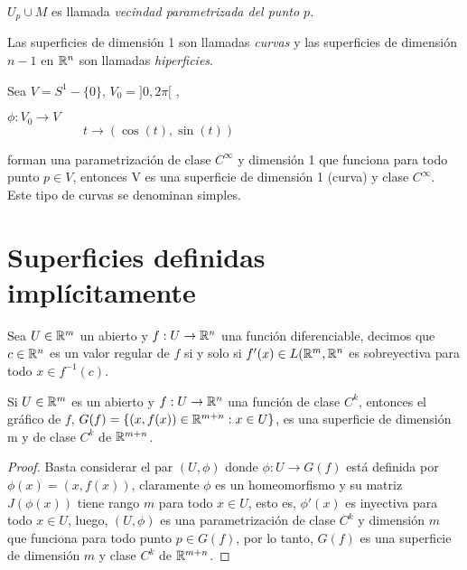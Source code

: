 \begin{Obs}
$U_{p}\cup M$ es llamada \textit{vecindad parametrizada del punto $p$}.
\end{Obs}

\begin{Obs}
Las superficies de dimensión 1 son llamadas \textit{curvas} y las superficies de dimensión $n-1$ en ${\mathbb{R}}^{n}$ son llamadas \textit{hiperficies}.
\end{Obs}

\begin{Ejm}
Sea $V=S^{1}-\{0\}$, $V_{0}=]0,2\pi[$ ,
\begin{center}
    $\phi:V_{0}\rightarrow V$\\
    $\qquad \qquad \qquad  t\longrightarrow(\cos(t),\sin(t))$
\end{center} forman una parametrización de clase $C^{\infty}$ y dimensión 1 que funciona para todo punto $p\in V$, entonces V es una superficie de dimensión 1 (curva) y clase $C^{\infty}$. Este tipo de curvas se denominan simples.
\end{Ejm}

\section{Superficies definidas implícitamente}

\begin{Def}
Sea $U\in{\mathbb{R}}^{m}$ un abierto y $f:U\rightarrow{\mathbb{R}}^{n}$ una función diferenciable, decimos que $c\in{\mathbb{R}}^{n}$ es un valor regular de $f$ si y solo si $f'(x)\in L({\mathbb{R}}^{m},{\mathbb{R}}^{n}$ es sobreyectiva para todo $x\in f^{-1}(c)$.
\end{Def}

\begin{Lem}
Si $U\in{\mathbb{R}}^{m}$ es un abierto y $f:U\rightarrow{\mathbb{R}}^{n}$ una función de clase $C^{k}$, entonces el gráfico de $f$, $G(f)=\{(x,f(x))\in {\mathbb{R}}^{m+n}:x\in U\}$, es una superficie de dimensión m y de clase $C^{k}$ de ${\mathbb{R}}^{m+n}$.
\end{Lem}

\begin{proof}
 Basta considerar el par $(U,\phi)$ donde $\phi:U\rightarrow G(f)$ está definida por $\phi(x)=(x,f(x))$, claramente $\phi$ es un homeomorfismo y su matriz $J(\phi(x))$ tiene rango $m$ para todo $x\in U$, esto es, $\phi'(x)$ es inyectiva para todo $x\in U$, luego, $(U,\phi)$ es una parametrización de clase $C^{k}$ y dimensión $m$ que funciona para todo punto $p\in G(f)$, por lo tanto, $G(f)$ es una superficie de dimensión $m$ y clase $C^{k}$ de ${\mathbb{R}}^{m+n}$.
\end{proof}

